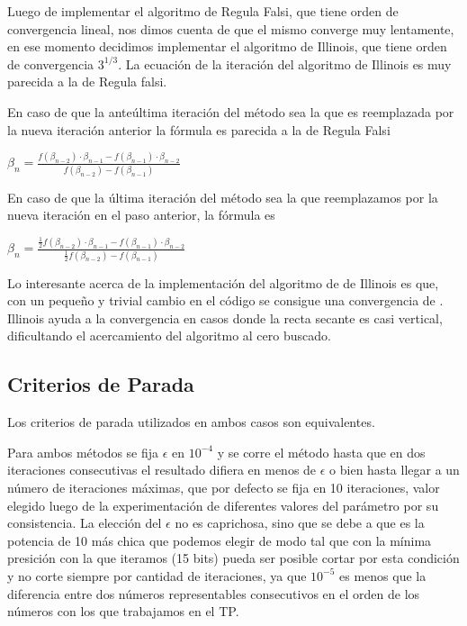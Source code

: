 Luego de implementar el algoritmo de Regula Falsi, que tiene orden de convergencia lineal, nos dimos cuenta de que el mismo converge muy lentamente, en ese momento decidimos implementar el algoritmo de Illinois, que tiene orden de convergencia $3^{1/3}$. La ecuación de la iteración del algoritmo de Illinois es muy parecida a la de Regula falsi.

En caso de que la ante\'ultima iteraci\'on del m\'etodo sea la que es reemplazada por la nueva iteraci\'on anterior la f\'ormula es parecida a la de Regula Falsi

$\beta_n = \frac{f(\beta_{n-2})\cdot \beta_{n-1} - f(\beta_{n-1})\cdot\beta_{n-2}}
{f(\beta_{n-2})-f(\beta_{n-1})}$

En caso de que la \'ultima iteraci\'on del m\'etodo sea la que reemplazamos por la nueva iteraci\'on en el paso anterior, la f\'ormula es

$\beta_n = \frac{\frac{1}{2}f(\beta_{n-2})\cdot \beta_{n-1} - f(\beta_{n-1})\cdot\beta_{n-2}}
{\frac{1}{2}f(\beta_{n-2})-f(\beta_{n-1})}$

Lo interesante acerca de la implementaci\'on del algoritmo de de Illinois es
que, con un peque\~no y trivial cambio en el c\'odigo se consigue una
convergencia de . Illinois ayuda a la convergencia en casos
donde la recta secante es casi vertical, dificultando el acercamiento del
algoritmo al cero buscado.

\subsection{Criterios de Parada}	

Los criterios de parada utilizados en ambos casos son equivalentes.

Para ambos m\'etodos se fija $\epsilon$ en $10^{-4}$ y se corre el m\'etodo hasta que en dos iteraciones consecutivas el resultado difiera en menos de $\epsilon$ o bien hasta llegar a un n\'umero de iteraciones m\'aximas, que por defecto se fija en 10 iteraciones, valor elegido luego de la experimentaci\'on de diferentes valores del par\'ametro por su consistencia.
La elecci\'on del $\epsilon$ no es caprichosa, sino que se debe a que es la potencia de 10 m\'as chica que podemos elegir de modo tal que con la m\'inima presici\'on con la que iteramos (15 bits) pueda ser posible cortar por esta condici\'on y no corte siempre por cantidad de iteraciones, ya que $10^{-5}$ es menos que la diferencia entre dos n\'umeros representables consecutivos en el orden de los n\'umeros con los que trabajamos en el TP.
